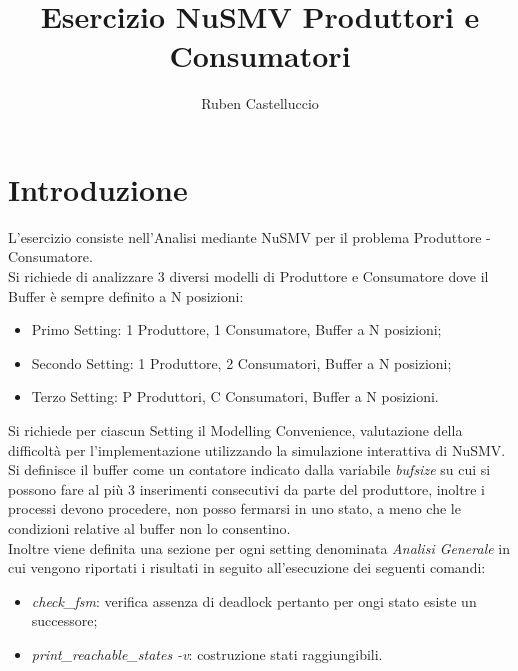 \documentclass{article}
\title{Esercizio NuSMV Produttori e Consumatori}
\author{Ruben Castelluccio}
\begin{document}
\maketitle


\section{Introduzione}
L'esercizio consiste nell'Analisi mediante NuSMV per il problema Produttore - Consumatore.
\\ Si richiede di analizzare 3 diversi modelli di Produttore e Consumatore dove il Buffer è sempre definito a N posizioni:
\begin{itemize}
    \item Primo Setting: 1 Produttore, 1 Consumatore, Buffer a N posizioni;
    \item Secondo Setting: 1 Produttore, 2 Consumatori, Buffer a N posizioni;
    \item Terzo Setting: P Produttori, C Consumatori, Buffer a N posizioni.
    \end{itemize}
    Si richiede per ciascun Setting il Modelling Convenience, valutazione della difficoltà per l'implementazione utilizzando la simulazione interattiva di NuSMV.
    \\Si definisce il buffer come un contatore indicato dalla variabile \textit{bufsize} su cui si possono fare al più 3 inserimenti consecutivi da parte del produttore, inoltre i processi devono procedere, non posso fermarsi in uno stato, a meno che le condizioni relative al buffer non lo consentino. 
    \\Inoltre viene definita una sezione per ogni setting denominata \textit{Analisi Generale} in cui vengono riportati i risultati in seguito all'esecuzione dei seguenti comandi:
    \begin{itemize}
        \item \textit{check\_fsm}: verifica assenza di deadlock pertanto per ongi stato esiste un successore;
        \item \textit{print\_reachable\_states -v}: costruzione stati raggiungibili.
    \end{itemize}
\clearpage
\end{document}
